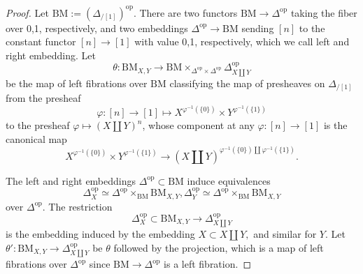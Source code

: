 \documentclass[10pt,oneside]{article}
\numberwithin{equation}{section} %
\numberwithin{figure}{section} %
\theoremstyle{plain}
\theoremstyle{definition}
\newcommand{\op}{\mathrm{op}}
\newcommand{\BM}{\mathrm{BM}}
\begin{document}
\begin{proof}
Let $\BM:= (\Delta_{/[1]})^\op$.
There are two functors $\BM \to \Delta^\op$ taking the fiber over 0,1, respectively, and two embeddings $\Delta^\op \to \BM$ sending $[n]$ to the constant functor $[n] \to [1]$ with value 0,1, respectively, which we call left and right embedding.
Let $$\theta : \BM_{X,Y} \to \BM \times_{\Delta^\op \times \Delta^\op} \Delta^\op_{X \coprod Y}$$ be the map of left fibrations over $\BM$ 
classifying the map of presheaves on $\Delta_{/[1]}$
from the presheaf $$\varphi: [n] \to [1] \mapsto X^{\varphi^{-1}(\{0\})} \times Y^{\varphi^{-1}(\{1\})}$$ to the presheaf 
$\varphi \mapsto (X\coprod Y)^n$, whose component at any
$\varphi: [n] \to [1]$ is the canonical map
$$ X^{\varphi^{-1}(\{0\})} \times Y^{\varphi^{-1}(\{1\})} \to (X \coprod Y)^{\varphi^{-1}(\{0\}) \coprod \varphi^{-1}(\{1\})}. $$

The left and right embeddings $\Delta^\op \subset \BM$
induce equivalences $$ \Delta^\op_X \simeq \Delta^\op \times_\BM \BM_{X,Y}, \Delta^\op_Y \simeq \Delta^\op \times_\BM \BM_{X,Y}$$ over $\Delta^\op.$
The restriction $$ \Delta^\op_X \subset \BM_{X,Y} \to \Delta^\op_{X \coprod Y} $$
is the embedding induced by the embedding $X \subset X \coprod Y,$
and similar for $Y.$
Let $\theta': \BM_{X,Y} \to \Delta^\op_{X \coprod Y}$ be $\theta$ followed by the projection, which is a map of left fibrations over $\Delta^\op$
since $\BM \to \Delta^\op$ is a left fibration. 



\end{proof}
\end{document}
